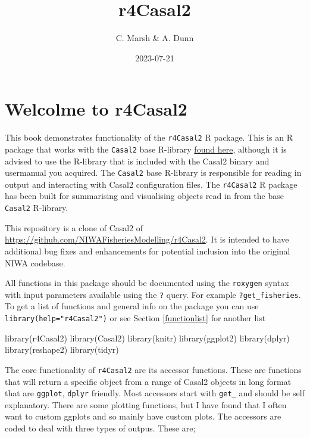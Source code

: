 \documentclass[
]{book}
\title{r4Casal2}
\author{C. Marsh \& A. Dunn}
\date{2023-07-21}
\newenvironment{Shaded}{\begin{snugshade}}{\end{snugshade}}
\newcommand{\FunctionTok}[1]{\textcolor[rgb]{0.00,0.00,0.00}{#1}}
\newcommand{\NormalTok}[1]{#1}
\begin{document}
\maketitle

{
\setcounter{tocdepth}{1}
\tableofcontents
}
\hypertarget{welcolme-to-r4casal2}{%
\chapter{\texorpdfstring{Welcolme to \textbf{r4Casal2}}{Welcolme to r4Casal2}}\label{welcolme-to-r4casal2}}

This book demonstrates functionality of the \texttt{r4Casal2} R package. This is an R package that works with the \texttt{Casal2} base R-library \href{https://github.com/alistairdunn1/CASAL2/tree/master/R-libraries}{found here}, although it is advised to use the R-library that is included with the Casal2 binary and usermanual you acquired. The \texttt{Casal2} base R-library is responsible for reading in output and interacting with Casal2 configuration files. The \texttt{r4Casal2} R package has been built for summarising and visualising objects read in from the base \texttt{Casal2} R-library.

This repository is a clone of Casal2 of \url{https://github.com/NIWAFisheriesModelling/r4Casal2}. It is intended to have additional bug fixes and enhancements for potential inclusion into the original NIWA codebase.

All functions in this package should be documented using the \texttt{roxygen} syntax with input parameters available using the \texttt{?} query. For example \texttt{?get\_fisheries}. To get a list of functions and general info on the package you can use \texttt{library(help="r4Casal2")} or see Section \ref{functionlist} for another list

\begin{Shaded}
\begin{Highlighting}[]
\FunctionTok{library}\NormalTok{(r4Casal2)}
\FunctionTok{library}\NormalTok{(Casal2)}
\FunctionTok{library}\NormalTok{(knitr)}
\FunctionTok{library}\NormalTok{(ggplot2)}
\FunctionTok{library}\NormalTok{(dplyr)}
\FunctionTok{library}\NormalTok{(reshape2)}
\FunctionTok{library}\NormalTok{(tidyr)}
\end{Highlighting}
\end{Shaded}

The core functionality of \texttt{r4Casal2} are its accessor functions. These are functions that will return a specific object from a range of Casal2 objects in long format that are \texttt{ggplot}, \texttt{dplyr} friendly. Most accessors start with \texttt{get\_} and should be self explanatory. There are some plotting functions, but I have found that I often want to custom ggplots and so mainly have custom plots. The accessors are coded to deal with three types of outpus. These are;
\end{document}

